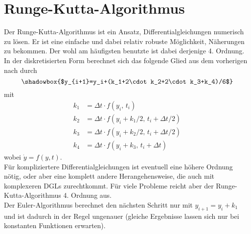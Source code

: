 \documentclass[12pt,a4paper,titlepage,headinclude,bibtotoc]{scrartcl}
\begin{document}
\section{Runge-Kutta-Algorithmus}
Der Runge-Kutta-Algorithmus ist ein Ansatz, Differentialgleichungen numerisch zu lösen.
Er ist eine einfache und dabei relativ robuste Möglichkeit, Näherungen zu bekommen.
Der wohl am häufigsten benutzte ist dabei derjenige 4. Ordnung.
In der diskretisierten Form berechnet sich das folgende Glied aus dem vorherigen nach \cite[S.130]{scientificcomp} durch
$$\shadowbox{$y_{i+1}=y_i+(k_1+2\cdot k_2+2\cdot k_3+k_4)/6$}$$ 
mit
\begin{align*}
k_1&=\Delta t\cdot f(y_i,\, t_i)\\
k_2&=\Delta t\cdot f(y_i+k_1/2,\, t_i+\Delta t/2)\\
k_3&=\Delta t\cdot f(y_i+k_2/2,\, t_i+\Delta t/2)\\
k_4&=\Delta t\cdot f(y_i+k_3,\, t_i+\Delta t)
\end{align*}
wobei $\dot y=f(y,t)$.\\
Für kompliziertere Differentialgleichungen ist eventuell eine höhere Ordnung nötig, oder aber eine komplett andere Herangehensweise, die auch mit komplexeren DGLs zurechtkommt.
Für viele Probleme reicht aber der Runge-Kutta-Algorithmus 4. Ordnung aus.\\
Der Euler-Algorithmus berechnet den nächsten Schritt nur mit $y_{i+1}=y_i+k_1$ und ist dadurch in der Regel ungenauer (gleiche Ergebnisse lassen sich nur bei konstanten Funktionen erwarten).
\end{document}
